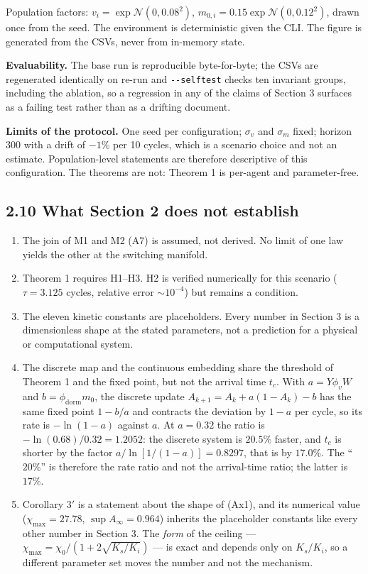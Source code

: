 \documentclass[11pt,a4paper]{article}
\providecommand{\tightlist}{\setlength{\itemsep}{0pt}\setlength{\parskip}{0pt}}
\begin{document}
Population factors: \(v_i=\exp\mathcal{N}(0,0.08^2)\),
\(m_{0,i}=0.15\exp\mathcal{N}(0,0.12^2)\), drawn once from the seed. The environment
is deterministic given the CLI. The figure is generated from the CSVs, never from
in-memory state.

\textbf{Evaluability.} The base run is reproducible byte-for-byte; the CSVs are
regenerated identically on re-run and \texttt{-\/-selftest} checks ten invariant groups,
including the ablation, so a regression in any of the claims of Section 3
surfaces as a failing test rather than as a drifting document.

\textbf{Limits of the protocol.} One seed per configuration; \(\sigma_v\) and
\(\sigma_m\) fixed; horizon 300 with a drift of \(-1\%\) per 10 cycles, which is a
scenario choice and not an estimate. Population-level statements are therefore
descriptive of this configuration. The theorems are not: Theorem 1 is
per-agent and parameter-free.

\subsection{2.10 What Section 2 does not establish}\label{what-section-2-does-not-establish}

\begin{enumerate}
\def\labelenumi{\arabic{enumi}.}
\tightlist
\item
  The join of M1 and M2 (A7) is assumed, not derived. No limit of one law yields
  the other at the switching manifold.
\item
  Theorem 1 requires H1--H3. H2 is verified numerically for this scenario
  (\(\tau=3.125\) cycles, relative error \(\sim10^{-4}\)) but remains a condition.
\item
  The eleven kinetic constants are placeholders. Every number in Section 3 is a
  dimensionless shape at the stated parameters, not a prediction for a physical
  or computational system.
\item
  The discrete map and the continuous embedding share the threshold of Theorem 1
  and the fixed point, but not the arrival time \(t_c\). With
  \(a=Y\phi_vW\) and \(b=\phi_{\mathrm{dorm}}m_0\), the discrete update
  \(A_{k+1}=A_k+a(1-A_k)-b\) has the same fixed point \(1-b/a\) and contracts the
  deviation by \(1-a\) per cycle, so its rate is \(-\ln(1-a)\) against \(a\). At
  \(a=0.32\) the ratio is \(-\ln(0.68)/0.32=1.2052\): the discrete system is
  \(20.5\%\) faster, and \(t_c\) is shorter by the factor
  \(a/\ln[1/(1-a)]=0.8297\), that is by \(17.0\%\). The
  ``\(20\%\)'' is therefore the rate ratio and not the arrival-time ratio; the
  latter is \(17\%\).
\item
  Corollary 3\('\) is a statement about the shape of (Ax1), and its numerical value
  (\(\chi_{\max}=27.78\), \(\sup A_\infty=0.964\)) inherits the placeholder constants
  like every other number in Section 3. The \emph{form} of the ceiling ---
  \(\chi_{\max}=\chi_0/(1+2\sqrt{K_s/K_i})\) --- is exact and depends only on
  \(K_s/K_i\), so a different parameter set moves the number and not the mechanism.
\end{enumerate}
\end{document}
